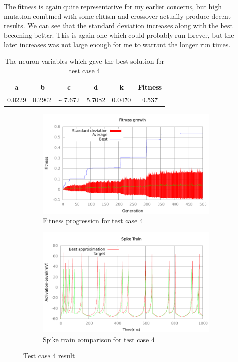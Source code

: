 The fitness is again quite representative for my earlier concerns, but high
mutation combined with some elitism and crossover actually produce decent
results. We can see that the standard deviation increases along with the best
becoming better. This is again one which could probably run forever, but the
later increases was not large enough for me to warrant the longer run times.
\begin{table}
	\begin{tabular}{c c c c c c}
		a & b & c & d & k & Fitness\\
		\hline
		0.0229 & 0.2902 & -47.672 & 5.7082 & 0.0470 & 0.537
	\end{tabular}
	\caption{The neuron variables which gave the best solution for test case
	4}
\end{table}
\begin{figure}[h]
	\centering
	\begin{subfigure}[b]{0.5\textwidth}
		\includegraphics[width=\textwidth]{../output/stdm_izzy_2_fitness.pdf}
		\caption{Fitness progression for test case 4}
		\label{fig:fitness-test-case-4}
	\end{subfigure}%
	\begin{subfigure}[b]{0.5\textwidth}
		\includegraphics[width=\textwidth]{../output/stdm_izzy_2_spike.pdf}
		\caption{Spike train comparison for test case 4}
		\label{fig:spike-test-case-4}
	\end{subfigure}
	\caption{Test case 4 result}
\end{figure}

